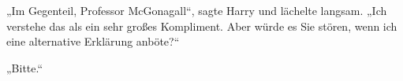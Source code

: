 „Im Gegenteil, Professor McGonagall“, sagte Harry und lächelte langsam.
„Ich verstehe das als ein sehr großes Kompliment. Aber würde es Sie stören, wenn ich eine alternative Erklärung anböte?“

„Bitte.“

